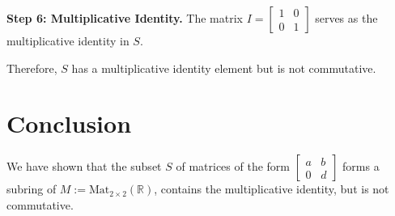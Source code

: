 \documentclass[12pt]{amsart}
\theoremstyle{definition}
\numberwithin{equation}{section}
\newcommand{\R}{\mathbb{R}}
\begin{document}
\begin{exercise}{7}
    \noindent \textbf{Step 6: Multiplicative Identity.}
    The matrix \(I = \begin{bmatrix} 1 & 0 \\ 0 & 1 \end{bmatrix}\) serves as the multiplicative identity in \(S\).

    Therefore, \(S\) has a multiplicative identity element but is not commutative.

    \section*{Conclusion}
    We have shown that the subset \(S\) of matrices of the form \(\begin{bmatrix} a & b \\ 0 & d \end{bmatrix}\) forms a subring of \(M := \text{Mat}_{2 \times 2}(\R)\), contains the multiplicative identity, but is not commutative.

\end{exercise}
\newpage
\end{document}
